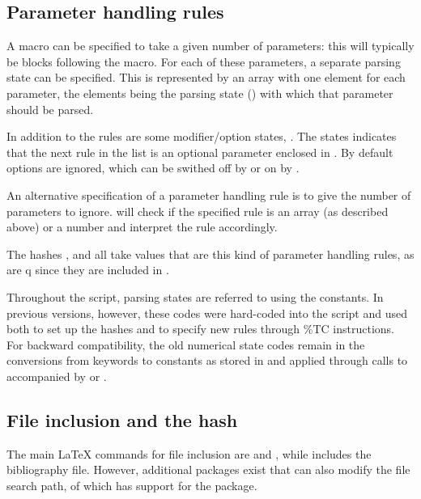 \documentclass{article}
\newcommand\wild{\ldots}
\begin{document}
\subsection{Parameter handling rules}

A macro can be specified to take a given number of parameters: this will typically be \code{\{\ldots\}} blocks following the macro. For each of these parameters, a separate parsing state can be specified. This is represented by an array with one element for each parameter, the elements being the parsing state (\code{\$STATE_\wild}) with which that parameter should be parsed.

In addition to the \code{\$STATE_\wild} rules are some modifier/option states, \code{\$_STATE_\wild}. The  states indicates that the next rule in the list is an optional parameter enclosed in \code{[]}. By default \code{[]} options are ignored, which can be swithed off by  or on by .

An alternative specification of a parameter handling rule is to give the number of parameters to ignore. \TeXcount{} will check if the specified rule is an array (as described above) or a number and interpret the rule accordingly.

The hashes ,  and  all take values that are this kind of parameter handling rules, as are q since they are included in .

Throughout the script, parsing states are referred to using the \code{\$STATE_\wild} constants. In previous versions, however, these codes were hard-coded into the script and used both to set up the hashes and to specify new rules through \%TC instructions. For backward compatibility, the old numerical state codes remain in the conversions from keywords to \code{\$STATE_\wild} constants as stored in  and applied through calls to  accompanied by  or .


\subsection{File inclusion and the  hash}

The main \LaTeX{} commands for file inclusion are  and , while  includes the  bibliography file. However, additional packages exist that can also modify the file search path, of which \TeXcount{} has support for the  package.
\end{document}
